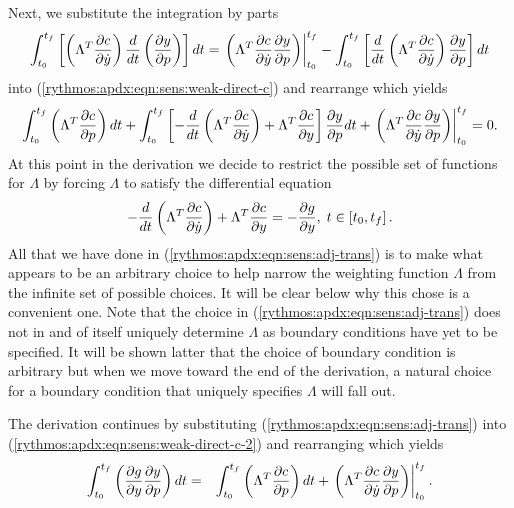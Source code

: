 \documentclass[pdf,ps2pdf,11pt]{SANDreport}
\begin{document}
Next, we substitute the integration by parts
%
\begin{equation}
\int_{t_0}^{t_f} \left[ \left( \Lambda^T \displaystyle{\frac{\partial c}{\partial \dot{y}}} \right) \frac{d}{dt}\left( \displaystyle{\frac{\partial y}{\partial p}} \right) \right] dt
= \left. \left( \Lambda^T \displaystyle{\frac{\partial c}{\partial \dot{y}}} \displaystyle{\frac{\partial y}{\partial p}} \right) \right|_{t_0}^{t_f}
- \int_{t_0}^{t_f} \left[ \frac{d}{dt}\left( \Lambda^T \displaystyle{\frac{\partial c}{\partial \dot{y}}} \right) \displaystyle{\frac{\partial y}{\partial p}} \right] dt
\end{equation}
%
into (\ref{rythmos:apdx:eqn:sens:weak-direct-c}) and rearrange which yields
%
\begin{equation}
\int_{t_0}^{t_f} \left( \Lambda^T \displaystyle{\frac{\partial c}{\partial p}} \right) dt
+ \int_{t_0}^{t_f} \left[
    - \frac{d}{dt}\left( \Lambda^T \displaystyle{\frac{\partial c}{\partial \dot{y}}} \right)
    + \Lambda^T \displaystyle{\frac{\partial c}{\partial y}}
  \right] \displaystyle{\frac{\partial y}{\partial p}} dt
+ \left. \left( \Lambda^T \displaystyle{\frac{\partial c}{\partial \dot{y}}} \displaystyle{\frac{\partial y}{\partial p}} \right) \right|_{t_0}^{t_f}
= 0.
\label{rythmos:apdx:eqn:sens:weak-direct-c-2}
\end{equation}
%
At this point in the derivation we decide to restrict the possible set of
functions for $\Lambda$ by forcing $\Lambda$ to satisfy the differential
equation
%
\begin{equation}
- \frac{d}{dt}\left( \Lambda^T \displaystyle{\frac{\partial c}{\partial \dot{y}}} \right)
+  \Lambda^T \displaystyle{\frac{\partial c}{\partial y}} = - \displaystyle{\frac{\partial g}{\partial y}}, \; t \in \left[ t_0, t_f \right].
\label{rythmos:apdx:eqn:sens:adj-trans}
\end{equation}
%
All that we have done in (\ref{rythmos:apdx:eqn:sens:adj-trans}) is to make
what appears to be an arbitrary choice to help narrow the weighting function
$\Lambda$ from the infinite set of possible choices.  It will be clear below
why this chose is a convenient one.  Note that the choice in
(\ref{rythmos:apdx:eqn:sens:adj-trans}) does not in and of itself uniquely
determine $\Lambda$ as boundary conditions have yet to be specified.  It will
be shown latter that the choice of boundary condition is arbitrary but when we
move toward the end of the derivation, a natural choice for a boundary
condition that uniquely specifies $\Lambda$ will fall out.

The derivation continues by substituting
(\ref{rythmos:apdx:eqn:sens:adj-trans}) into
(\ref{rythmos:apdx:eqn:sens:weak-direct-c-2}) and rearranging which yields
%
\begin{eqnarray}
\int_{t_0}^{t_f} \left( \displaystyle{\frac{\partial g}{\partial y}} \displaystyle{\frac{\partial y}{\partial p}} \right) dt
& = &  \int_{t_0}^{t_f} \left( \Lambda^T \displaystyle{\frac{\partial c}{\partial p}} \right) dt
+ \left. \left( \Lambda^T \displaystyle{\frac{\partial c}{\partial \dot{y}}} \displaystyle{\frac{\partial y}{\partial p}} \right) \right|^{t_f}_{t_0}.
\label{rythmos:apdx:eqn:sens:weak-direct-c-3}
\end{eqnarray}
\end{document}

